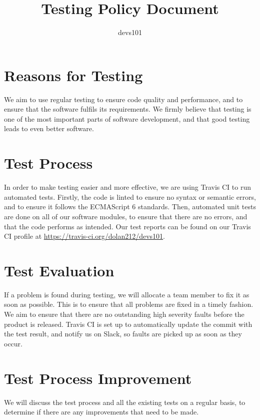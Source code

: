 \documentclass{article}
\title{Testing Policy Document}
\author{devs101}
\begin{document}
\maketitle
\newpage

\section{Reasons for Testing}
We aim to use regular testing to ensure code quality and performance, and to ensure that the software fulfils its requirements.
We firmly believe that testing is one of the most important parts of software development, and that good testing leads to even
better software.

\section{Test Process}
In order to make testing easier and more effective, we are using Travis CI to run automated tests. Firstly, the code is linted
to ensure no syntax or semantic errors, and to ensure it follows the ECMAScript 6 standards. Then, automated unit tests are done
on all of our software modules, to ensure that there are no errors, and that the code performs as intended.
Our test reports can be found on our Travis CI profile at \url{https://travis-ci.org/dolan212/devs101}. 

\section{Test Evaluation}
If a problem is found during testing, we will allocate a team member to fix it as soon as possible. This is to ensure that all
problems are fixed in a timely fashion. We aim to ensure that there are no outstanding high severity faults before the product is released.
Travis CI is set up to automatically update the commit with the test result, and notify us on Slack, so faults are picked up as soon as
they occur.

\section{Test Process Improvement}
We will discuss the test process and all the existing tests on a regular basis, to determine if there are any improvements that need to be made.
\end{document}

